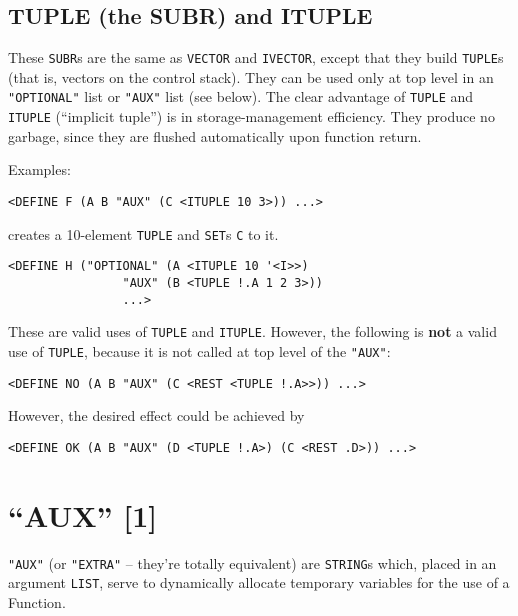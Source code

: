 \documentclass[a4paper]{scrbook}
\begin{document}
\subsection{TUPLE (the SUBR) and ITUPLE}\label{tuple-the-subr-and-ituple}

These \texttt{SUBR}s are the same as \texttt{VECTOR} and \texttt{IVECTOR}, except that they build
\texttt{TUPLE}s (that is, vectors on the control stack). They can be used only at top level in
an \texttt{"OPTIONAL"} list or \texttt{"AUX"} list (see below). The clear advantage of \texttt{TUPLE} and
\texttt{ITUPLE} (``implicit tuple'') is in storage-management efficiency. They produce no
garbage, since they are flushed automatically upon function return.

Examples:

\begin{verbatim}
<DEFINE F (A B "AUX" (C <ITUPLE 10 3>)) ...>
\end{verbatim}

creates a 10-element \texttt{TUPLE} and \texttt{SET}s \texttt{C} to it.

\begin{verbatim}
<DEFINE H ("OPTIONAL" (A <ITUPLE 10 '<I>>)
                "AUX" (B <TUPLE !.A 1 2 3>))
                ...>
\end{verbatim}

These are valid uses of \texttt{TUPLE} and \texttt{ITUPLE}. However, the following is \textbf{not} a valid use of
\texttt{TUPLE}, because it is not called at top level of the \texttt{"AUX"}:

\begin{verbatim}
<DEFINE NO (A B "AUX" (C <REST <TUPLE !.A>>)) ...>
\end{verbatim}

However, the desired effect could be achieved by

\begin{verbatim}
<DEFINE OK (A B "AUX" (D <TUPLE !.A>) (C <REST .D>)) ...>
\end{verbatim}

\section{\texorpdfstring{``AUX'' {[}1{]}}{9.3. AUX {[}1{]}}}\label{aux-1}

\texttt{"AUX"}  (or \texttt{"EXTRA"}  -- they're totally
equivalent) are \texttt{STRING}s which, placed in an argument \texttt{LIST}, serve to dynamically allocate temporary
variables for the use of a Function.
\end{document}
